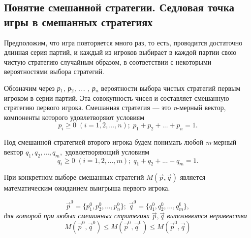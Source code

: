 \subsection{Понятие смешанной стратегии. Седловая точка игры
в смешанных стратегиях}

Предположим, что игра повторяется много раз, то есть, проводится достаточно длинная серия партий, и каждый из игроков выбирает в каждой партии свою чистую стратегию случайным образом, в соответствии с некоторыми вероятностями выбора стратегий.


Обозначим через  \emph{р$_{1}$, р$_{2}$, ... , р$_{n}$}  вероятности выбора чистых стратегий первым игроком в серии партий. Эта совокупность чисел и составляет смешанную стратегию первого игрока.  Смешанная стратегия — это \emph{n}-мерный вектор, компоненты которого удовлетворяют условиям
\begin{equation}
\label{equation_4_3}
p_{i} \geqslant 0 \; (i = 1, 2, ..., n); \; p_{1} + p_{2} + ... + p_{n} = 1.
\end{equation}

Под смешанной стратегией второго игрока будем понимать любой \emph{m}-мерный вектор {$q_{1}, q_{2}, ..., q_{m},$} удовлетворяющий условиям
\begin{equation}
\label{equation_4_4}
q_{i} \geqslant 0 \; (i = 1, 2, ..., m); \; q_{1} + q_{2} + ... + q_{m} = 1.
\end{equation}


При конкретном выборе смешанных стратегий $M(\vec{p}, \vec{q})$   является математическим ожиданием выигрыша первого игрока.

\begin{equation}
\label{equation_4_5}
    {\vec{p}^0} = \{p_{1}^0, p_{2}^0, ..., p_{n}^0\}; \; {\vec{q}^0} = \{q_{1}^0, q_{2}^0, ..., q_{m}^0\},
\end{equation}
\emph{для которой при любых смешанных стратегиях $\vec{p}, \vec{q}$ выполняются неравенства}
\begin{equation}
\label{equation_4_6}
M(\vec{p}^0, \vec{q}^0) \leqslant M(\vec{p}^0, \vec{q}^0) \leqslant M(\vec{p}^0, \vec{q})
\end{equation}

